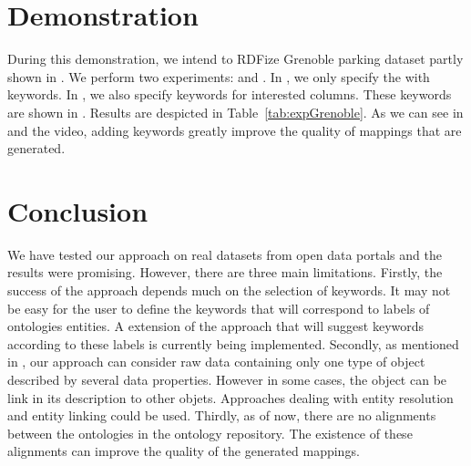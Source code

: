 \section{Demonstration}\label{sec:demonstration}




During this demonstration, we intend to RDFize Grenoble parking dataset partly shown in . We perform two experiments: and . In , we only specify the  with keywords. In , we also specify keywords for interested columns. These keywords are shown in . Results are despicted in Table~\ref{tab:expGrenoble}. As we can see in  and the video, adding keywords greatly improve the quality of mappings that are generated.


\section{Conclusion}
We have tested our approach on real datasets from open data portals and the results were promising. However, there are three main limitations. Firstly, the success of the approach depends much on the selection of keywords. It may not be easy for the user to define the keywords that will correspond to labels of ontologies entities. A extension of the approach that will suggest keywords according to these labels is currently being implemented. Secondly, as mentioned in , our approach can consider raw data containing only one type of object described by several data properties. However in some cases, the object can be link in its description to other objets. Approaches dealing with entity resolution and entity linking could be used.  
Thirdly, as of now, there are no alignments between the ontologies in the ontology repository. The existence of these alignments can improve the quality of the generated mappings.



